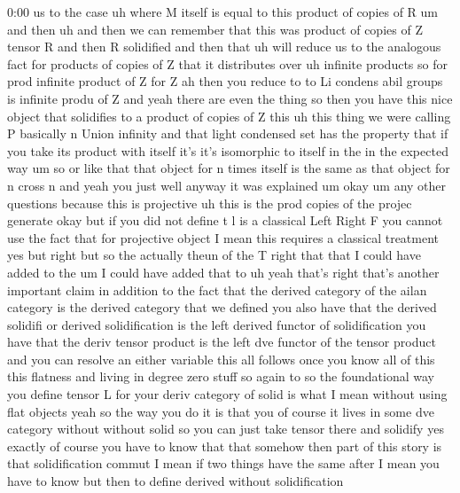 \begin{unfinished}{0:00}
us  to  the  case  uh  where  M  itself  is
equal  to  this  product  of  copies  of
R
um  and  then  uh  and  then  we  can  remember
that  this  was  product  of  copies  of  Z
tensor  R  and  then  R  solidified  and  then
that  uh  will  reduce  us  to  the  analogous
fact  for  products  of  copies  of  Z  that  it
distributes  over  uh  infinite
products
so  for  prod  infinite  product  of  Z  for
Z  ah  then  you  reduce  to  to  Li  condens
abil  groups  is  infinite  produ  of  Z
and  yeah  there  are  even  the  thing  so
then  you  have  this  nice  object  that
solidifies  to  a  product  of  copies  of  Z
this  uh  this  thing  we  were  calling  P
basically  n  Union  infinity  and  that
light  condensed  set  has  the  property
that  if  you  take  its  product  with  itself
it's  it's  isomorphic  to  itself  in  the  in
the  expected  way  um  so  or  like  that  that
object  for  n  times  itself  is  the  same  as
that  object  for  n  cross  n  and  yeah  you
just  well  anyway  it  was
explained
um
okay  um  any  other
questions
because  this  is
projective  uh  this  is  the  prod  copies  of
the
projec
generate  okay  but  if  you  did  not  define
t  l  is  a  classical  Left  Right  F  you
cannot  use  the  fact  that  for  projective
object  I  mean  this  requires  a  classical
treatment  yes  but  right  but
so  the  actually  theun  of  the  T  right
that  that  I  could  have  added  to  the  um  I
could  have  added  that  to  uh  yeah  that's
right  that's  another  important  claim  in
addition  to  the  fact  that  the  derived
category  of  the  ailan  category  is  the
derived  category  that  we  defined  you
also  have  that  the  derived  solidifi  or
derived  solidification  is  the  left
derived  functor  of  solidification  you
have  that  the  deriv  tensor  product  is
the  left  dve  functor  of  the  tensor
product  and  you  can  resolve  an  either
variable  this  all  follows  once  you  know
all  of  this  this  flatness  and  living  in
degree  zero
stuff  so  again  to  so  the  foundational
way  you  define  tensor  L  for  your  deriv
category  of  solid  is  what  I  mean  without
using  flat  objects  yeah  so  the  way  you
do  it  is  that  you  of  course  it  lives  in
some  dve  category  without  without  solid
so  you  can  just  take  tensor  there  and
solidify  yes  exactly  of  course  you  have
to  know  that  that  somehow  then  part  of
this  story  is  that  solidification  commut
I  mean  if  two  things  have  the  same  after
I  mean  you  have  to  know  but  then  to
define  derived  without  solidification

\end{unfinished}
